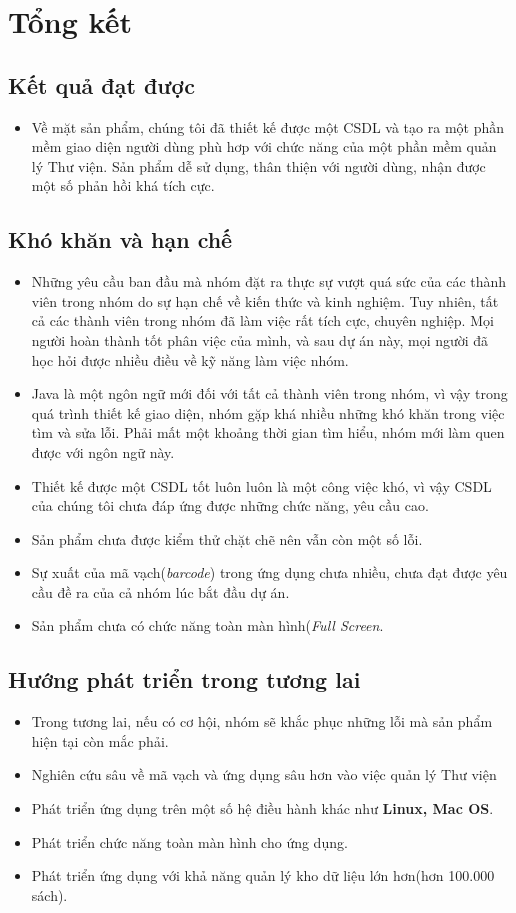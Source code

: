 \documentclass[12pt]{report}
\begin{document}
	\chapter{Tổng kết}
		\section{Kết quả đạt được}
			\begin{itemize}
				\item Về mặt sản phẩm, chúng tôi đã thiết kế được một CSDL và tạo ra một phần mềm giao diện người dùng phù hơp với chức năng của một phần mềm quản lý Thư viện. Sản phẩm dễ sử dụng, thân thiện với người dùng, nhận được một số phản hồi khá tích cực.
			\end{itemize}
		\section{Khó khăn và hạn chế}
			\begin{itemize}
				\item Những yêu cầu ban đầu mà nhóm đặt ra thực sự vượt quá sức của các thành viên trong nhóm do sự hạn chế về kiến thức và kinh nghiệm. Tuy nhiên, tất cả các thành viên trong nhóm đã làm việc rất tích cực, chuyên nghiệp. Mọi người hoàn thành tốt phân việc của mình, và sau dự án này, mọi người đã học hỏi được nhiều điều về kỹ năng làm việc nhóm.
				\item Java là một ngôn ngữ mới đối với tất cả thành viên trong nhóm, vì vậy trong quá trình thiết kế giao diện, nhóm gặp khá nhiều những khó khăn trong việc tìm và sửa lỗi. Phải mất một khoảng thời gian tìm hiểu, nhóm mới làm quen được với ngôn ngữ này.
				\item Thiết kế được một CSDL tốt luôn luôn là một công việc khó, vì vậy CSDL của chúng tôi chưa đáp ứng được những chức năng, yêu cầu cao. 
				\item Sản phẩm chưa được kiểm thử chặt chẽ nên vẫn còn một số lỗi.
				\item Sự xuất của mã vạch(\textit{barcode}) trong ứng dụng chưa nhiều, chưa đạt được yêu cầu đề ra của cả nhóm lúc bắt đầu dự án.
				\item Sản phẩm chưa có chức năng toàn màn hình(\textit{Full Screen}.
			\end{itemize}
		\section{Hướng phát triển trong tương lai}
			\begin{itemize}
				\item Trong tương lai, nếu có cơ hội, nhóm sẽ khắc phục những lỗi mà sản phẩm hiện tại còn mắc phải.
				\item Nghiên cứu sâu về mã vạch và ứng dụng sâu hơn vào việc quản lý Thư viện
				\item Phát triển ứng dụng trên một số hệ điều hành khác như \textbf{Linux, Mac OS}.
				\item Phát triển chức năng toàn màn hình cho ứng dụng.
				\item Phát triển ứng dụng với khả năng quản lý kho dữ liệu lớn hơn(hơn 100.000 sách).
			\end{itemize}
	\newpage
\end{document}
